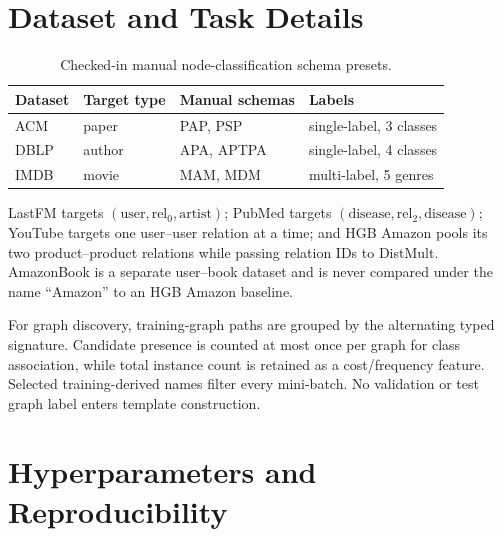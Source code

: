 \documentclass{article}
\begin{document}
\section{Dataset and Task Details}
\label{app:datasets}

\begin{table}[h]
  \centering
  \caption{Checked-in manual node-classification schema presets.}
  \small
  \begin{tabular}{llll}
    \toprule
    \textbf{Dataset} & \textbf{Target type} & \textbf{Manual schemas} & \textbf{Labels} \\
    \midrule
    ACM & paper & PAP, PSP & single-label, 3 classes \\
    DBLP & author & APA, APTPA & single-label, 4 classes \\
    IMDB & movie & MAM, MDM & multi-label, 5 genres \\
    \bottomrule
  \end{tabular}
\end{table}

LastFM targets $(\text{user},\mathrm{rel}_0,\text{artist})$; PubMed targets
$(\text{disease},\mathrm{rel}_2,\text{disease})$; YouTube targets one user--user relation at a
time; and HGB Amazon pools its two product--product relations while passing relation IDs to
DistMult. AmazonBook is a separate user--book dataset and is never compared under the name
``Amazon'' to an HGB Amazon baseline.

For graph discovery, training-graph paths are grouped by the alternating typed signature.
Candidate presence is counted at most once per graph for class association, while total instance
count is retained as a cost/frequency feature. Selected training-derived names filter every
mini-batch. No validation or test graph label enters template construction.

\section{Hyperparameters and Reproducibility}
\label{app:hyperparameters}
\end{document}
